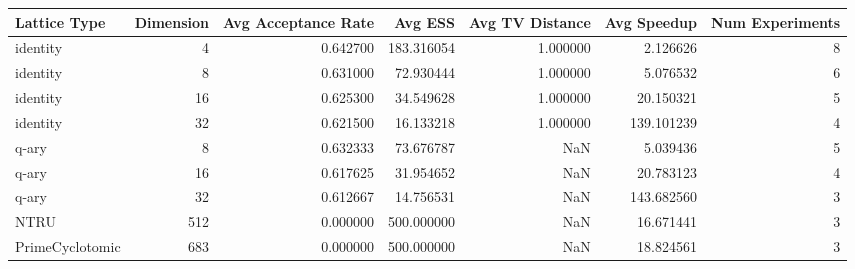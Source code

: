 \begin{tabular}{lrrrrrr}
\toprule
Lattice Type & Dimension & Avg Acceptance Rate & Avg ESS & Avg TV Distance & Avg Speedup & Num Experiments \\
\midrule
identity & 4 & 0.642700 & 183.316054 & 1.000000 & 2.126626 & 8 \\
identity & 8 & 0.631000 & 72.930444 & 1.000000 & 5.076532 & 6 \\
identity & 16 & 0.625300 & 34.549628 & 1.000000 & 20.150321 & 5 \\
identity & 32 & 0.621500 & 16.133218 & 1.000000 & 139.101239 & 4 \\
q-ary & 8 & 0.632333 & 73.676787 & NaN & 5.039436 & 5 \\
q-ary & 16 & 0.617625 & 31.954652 & NaN & 20.783123 & 4 \\
q-ary & 32 & 0.612667 & 14.756531 & NaN & 143.682560 & 3 \\
NTRU & 512 & 0.000000 & 500.000000 & NaN & 16.671441 & 3 \\
PrimeCyclotomic & 683 & 0.000000 & 500.000000 & NaN & 18.824561 & 3 \\
\bottomrule
\end{tabular}
